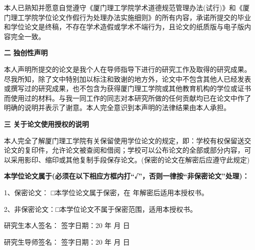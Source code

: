 \begin{titlepage}
{本人已熟知并愿意自觉遵守《厦门理工学院学术道德规范管理办法(试行)》和《厦门理工学院学位论文作假行为处理办法实施细则》的所有内容，承诺所提交的毕业和学位论文是终稿，不存在学术造假或学术不端行为，且论文的纸质版与电子版内容完全一致。

\begin{center}
	\bfseries
	二  \quad \quad  独创性声明
\end{center}


本人声明所提交的论文是我个人在导师指导下进行的研究工作及取得的研究成果。尽我所知，除了文中特别加以标注和致谢的地方外，论文中不包含其他人已经发表或撰写过的研究成果，也不包含为获得厦门理工学院或其他教育机构的学位或证书而使用过的材料。与我一同工作的同志对本研究所做的任何贡献均已在论文中作了明确的说明并表示了谢意。本人完全意识到本声明的法律结果由本人承担。

\begin{center}
	\bfseries
	三 \quad \quad 关于论文使用授权的说明
\end{center}

本人完全了解厦门理工学院有关保留使用学位论文的规定，即：学校有权保留送交论文的复印件，允许论文被查阅和借阅；学校可以公布论文的全部或部分内容，可以采用影印、缩印或其他复制手段保存论文。(保密的论文在解密后应遵守此规定)


{\bfseries 本学位论文属于(必须在以下相应方框内打“√”，否则一律按“非保密论文”处理)：}


1、保密论文：   □本学位论文属于保密，在      年解密后适用本授权书。

2、非保密论文：□本学位论文不属于保密范围，适用本授权书。


\vspace{3em}

研究生本人签名：         \hspace{10em}          签字日期：20 \quad  年 \quad 月 \quad 日

研究生导师签名：        \hspace{10em}             签字日期：20 \quad 年 \quad  月 \quad 日

}
		
		
		

\end{titlepage}
